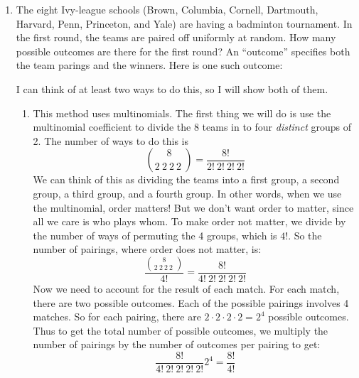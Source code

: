 \documentclass[12pt]{article}
\begin{document}
\begin{enumerate}
\item The eight Ivy-league schools (Brown, Columbia, Cornell, Dartmouth, Harvard, Penn, Princeton, and Yale) are having a badminton tournament. In the first round, the teams are paired off uniformly at random. How many possible outcomes are there for the first round? An ``outcome'' specifies both the team parings and the winners. Here is one such outcome:
\begin{figure}[H]
\centering
{}
\end{figure}

I can think of at least two ways to do this, so I will show both of them.
\begin{enumerate}
\item This method uses multinomials. The first thing we will do is use the multinomial coefficient to divide the 8 teams in to four \emph{distinct} groups of 2. The number of ways to do this is
\[
\binom{8}{2\:2\:2\:2\:} = \frac{8!}{2!\:2!\:2!\:2!}
\]
We can think of this as dividing the teams into a first group, a second group, a third group, and a fourth group. In other words, when we use the multinomial, order matters! But we don't want order to matter, since all we care is who plays whom. To make order not matter, we divide by the number of ways of permuting the 4 groups, which is $4!$. So the number of pairings, where order does not matter, is:
\[
\dfrac{ \binom{8}{2\:2\:2\:2\:} } {4!} = \frac{8!}{4!\:2!\:2!\:2!\:2!}
\]
Now we need to account for the result of each match. For each match, there are two possible outcomes. Each of the possible pairings involves 4 matches. So for each pairing, there are $2 \cdot 2 \cdot 2 \cdot 2 = 2^4$ possible outcomes. Thus to get the total number of possible outcomes, we multiply the number of pairings by the number of outcomes per pairing to get:
\[
\frac{8!}{4!\:2!\:2!\:2!\:2!} 2^4 = \frac{8!}{4!}
\]


\end{enumerate}
\end{enumerate}
\end{document}
